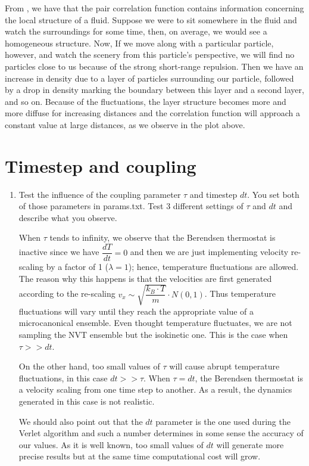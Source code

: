 \documentclass[12pt,letterpaper]{report}
\begin{document}
\begin{enumerate}
	From \cite{thijssen_2007}, we have that the pair correlation function contains information concerning the local structure of a fluid. Suppose we were to sit somewhere in the fluid and watch the surroundings for some time, then, on average, we would see a homogeneous structure. Now, If we move along with a particular particle, however, and watch the scenery from this particle's perspective, we will find no particles close to us because of the strong short-range repulsion. Then we have an increase in density due to a layer of particles surrounding our particle, followed by a drop in density marking the boundary between this layer and a second layer, and so on. Because of the fluctuations, the layer structure becomes more and more diffuse for increasing distances and the correlation function will approach a constant value at large distances, as we observe in the plot above. 

  \end{enumerate}
	
	\section*{Timestep and coupling}
	\begin{enumerate}
		\item
		Test the influence of the coupling parameter $\tau$ and timestep $dt$. You set both of those parameters in params.txt. Test 3 different settings of $\tau$ and $dt$ and describe what you observe. 
		
		When $\tau$ tends to infinity, we observe that the Berendsen thermostat is inactive since we have $\dfrac{dT}{dt} = 0$ and then we are just implementing velocity re-scaling by a factor of 1 ($\lambda = 1$); hence, temperature fluctuations are allowed. The reason why this happens is that the velocities are first generated according to the re-scaling $v_{x} \sim \sqrt{\dfrac{k_{B}\cdot T}{m}} \cdot N(0, 1)$. Thus temperature fluctuations will vary until they reach the appropriate value of a microcanonical ensemble.	Even thought temperature fluctuates, we are not sampling the NVT ensemble but the isokinetic one. This is the case when $\tau > > dt$.
		
		On the other hand, too small values of $\tau$ will cause abrupt temperature fluctuations, in this case $dt > > \tau$.
		When $\tau = dt$, the Berendsen thermostat is a velocity scaling from one time step to another. As a result, the dynamics generated in this case is not realistic. 
		
		We should also point out that the $dt$ parameter is the one used during the Verlet algorithm and such a number determines in some sense the accuracy of our values. As it is well known, too small values of $dt$ will generate more precise results but at the same time computational cost will grow. 
		
	\end{enumerate}
	
	\newpage
	\printbibliography
\end{document}
